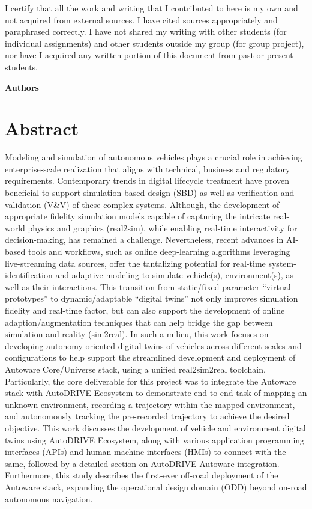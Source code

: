 \begin{titlepage}
    I certify that all the work and writing that I contributed to here is my own and not acquired from external sources. I have cited sources appropriately and paraphrased correctly. I have not shared my writing with other students (for individual assignments) and other students outside my group (for group project), nor have I acquired any written portion of this document from past or present students.

    \begin{flushright}
    \textbf{Authors}
    \end{flushright}

    \pagebreak

    \section*{Abstract}\label{Abstract}
    \thispagestyle{empty}

    Modeling and simulation of autonomous vehicles plays a crucial role in achieving enterprise-scale realization that aligns with technical, business and regulatory requirements. Contemporary trends in digital lifecycle treatment have proven beneficial to support simulation-based-design (SBD) as well as verification and validation (V\&V) of these complex systems. Although, the development of appropriate fidelity simulation models capable of capturing the intricate real-world physics and graphics (real2sim), while enabling real-time interactivity for decision-making, has remained a challenge. Nevertheless, recent advances in AI-based tools and workflows, such as online deep-learning algorithms leveraging live-streaming data sources, offer the tantalizing potential for real-time system-identification and adaptive modeling to simulate vehicle(s), environment(s), as well as their interactions. This transition from static/fixed-parameter ``virtual prototypes'' to dynamic/adaptable ``digital twins'' not only improves simulation fidelity and real-time factor, but can also support the development of online adaption/augmentation techniques that can help bridge the gap between simulation and reality (sim2real). In such a milieu, this work focuses on developing autonomy-oriented digital twins of vehicles across different scales and configurations to help support the streamlined development and deployment of Autoware Core/Universe stack, using a unified real2sim2real toolchain. Particularly, the core deliverable for this project was to integrate the Autoware stack with AutoDRIVE Ecosystem to demonstrate end-to-end task of mapping an unknown environment, recording a trajectory within the mapped environment, and autonomously tracking the pre-recorded trajectory to achieve the desired objective. This work discusses the development of vehicle and environment digital twins using AutoDRIVE Ecosystem, along with various application programming interfaces (APIs) and human-machine interfaces (HMIs) to connect with the same, followed by a detailed section on AutoDRIVE-Autoware integration. Furthermore, this study describes the first-ever off-road deployment of the Autoware stack, expanding the operational design domain (ODD) beyond on-road autonomous navigation.\\


\end{titlepage}
